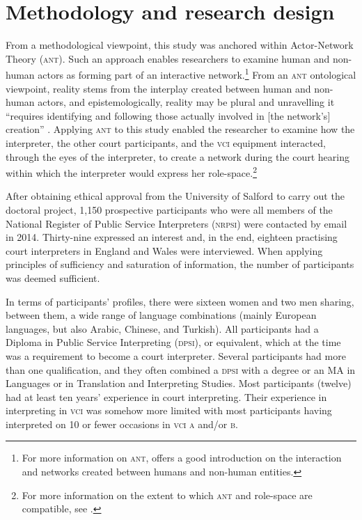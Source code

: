 \documentclass[output=paper]{langsci/langscibook}
\begin{document}
\section{Methodology and research design}
\label{sec:devaux:4}
From a methodological viewpoint, this study was anchored within Actor-Net\-work Theory (\textsc{ant}). Such an approach enables researchers to examine human and non-human actors as forming part of an interactive network.\footnote{For more information on \textsc{ant}, \citet{Latour2005} offers a good introduction on the interaction and networks created between humans and non-human entities.} From an \textsc{ant} ontological viewpoint, reality stems from the interplay created between human and non-human actors, and epistemologically, reality may be plural and unravelling it “requires identifying and following those actually involved in [the network’s] creation” \citep[112]{Bonner2013}. Applying \textsc{ant} to this study enabled the researcher to examine how the interpreter, the other court participants, and the \textsc{vci} equipment interacted, through the eyes of the interpreter, to create a network during the court hearing within which the interpreter would express her role-space.\footnote{For more information on the extent to which \textsc{ant} and role-space are compatible, see \citet{Devaux2017b}.} 

After obtaining ethical approval from the University of Salford to carry out the doctoral project, 1,150 prospective participants who were all members of the National Register of Public Service Interpreters (\textsc{nrpsi}) were contacted by email in 2014. Thirty-nine expressed an interest and, in the end, eighteen practising court interpreters in England and Wales were interviewed. When applying  principles of sufficiency and saturation of information, the number of participants was deemed sufficient. 

In terms of participants’ profiles, there were sixteen women and two men sharing, between them, a wide range of language combinations (mainly European languages, but also Arabic, Chinese, and Turkish). All participants had a Diploma in Public Service Interpreting (\textsc{dpsi}), or equivalent, which at the time was a requirement to become a court interpreter. Several participants had more than one qualification, and they often combined a \textsc{dpsi} with a degree or an MA in Languages or in Translation and Interpreting Studies. Most participants (twelve) had at least ten years’ experience in court interpreting. Their experience in interpreting in \textsc{vci} was somehow more limited with most participants having interpreted on 10 or fewer occasions in \textsc{vci a} and/or \textsc{b}.  
\end{document}
